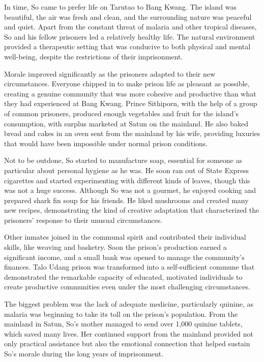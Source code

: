 \documentclass[
  Letterpaper,
]{scrbook}
\begin{document}
In time, So came to prefer life on Tarutao to Bang Kwang. The island was
beautiful, the air was fresh and clean, and the surrounding nature was
peaceful and quiet. Apart from the constant threat of malaria and other
tropical diseases, So and his fellow prisoners led a relatively healthy
life. The natural environment provided a therapeutic setting that was
conducive to both physical and mental well-being, despite the
restrictions of their imprisonment.

Morale improved significantly as the prisoners adapted to their new
circumstances. Everyone chipped in to make prison life as pleasant as
possible, creating a genuine community that was more cohesive and
productive than what they had experienced at Bang Kwang. Prince
Sithiporn, with the help of a group of common prisoners, produced enough
vegetables and fruit for the island's consumption, with surplus marketed
at Satun on the mainland. He also baked bread and cakes in an oven sent
from the mainland by his wife, providing luxuries that would have been
impossible under normal prison conditions.

Not to be outdone, So started to manufacture soap, essential for someone
as particular about personal hygiene as he was. He soon ran out of State
Express cigarettes and started experimenting with different kinds of
leaves, though this was not a huge success. Although So was not a
gourmet, he enjoyed cooking and prepared shark fin soup for his friends.
He liked mushrooms and created many new recipes, demonstrating the kind
of creative adaptation that characterized the prisoners' response to
their unusual circumstances.

Other inmates joined in the communal spirit and contributed their
individual skills, like weaving and basketry. Soon the prison's
production earned a significant income, and a small bank was opened to
manage the community's finances. Talo Udang prison was transformed into
a self-sufficient commune that demonstrated the remarkable capacity of
educated, motivated individuals to create productive communities even
under the most challenging circumstances.

The biggest problem was the lack of adequate medicine, particularly
quinine, as malaria was beginning to take its toll on the prison's
population. From the mainland in Satun, So's mother managed to send over
1,000 quinine tablets, which saved many lives. Her continued support
from the mainland provided not only practical assistance but also the
emotional connection that helped sustain So's morale during the long
years of imprisonment.
\end{document}
